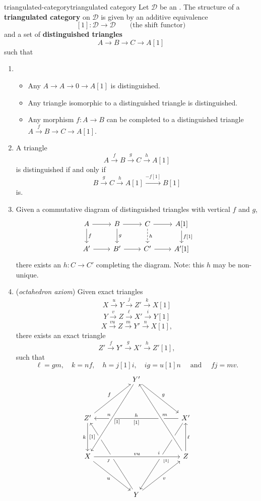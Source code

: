 \begin{topic}{triangulated-category}{triangulated category}
    Let $\mathcal{D}$ be an . The structure of a \textbf{triangulated category} on $\mathcal{D}$ is given by an additive equivalence
    \[ [1] : \mathcal{D} \to \mathcal{D} \qquad \text{(the shift functor)} \]
    and a set of \textbf{distinguished triangles}
    \[ A \to B \to C \to A[1] \]
    such that
    \begin{enumerate}
        \item \begin{itemize}
            \item Any $A \to A \to 0 \to A[1]$ is distinguished.
            \item Any triangle isomorphic to a distinguished triangle is distinguished.
            \item Any morphism $f : A \to B$ can be completed to a distinguished triangle $A \overset{f}{\to} B \to C \to A[1]$.
        \end{itemize}
        \item A triangle
        \[ A \xrightarrow{f} B \xrightarrow{g} C \xrightarrow{h} A[1] \]
        is distinguished if and only if
        \[ B \xrightarrow{g} C \xrightarrow{h} A[1] \xrightarrow{-f[1]} B[1] \]
        is.
        \item Given a commutative diagram of distinguished triangles with vertical $f$ and $g$,
        \[ \begin{tikzcd}
            A \arrow{r} \arrow{d}{f} & B \arrow{r} \arrow{d}{g} & C \arrow{r} \arrow[dashed]{d}{h} & A[1] \arrow{d}{f[1]} \\
            A' \arrow{r} & B' \arrow{r} & C' \arrow{r} & A'[1]
        \end{tikzcd} \]
        there exists an $h : C \to C'$ completing the diagram. Note: this $h$ may be non-unique.
        \item (\textit{octahedron axiom}) Given exact triangles
        \[ X \xrightarrow{u} Y \xrightarrow{j} Z' \xrightarrow{k} X[1] \]
        \[ Y \xrightarrow{v} Z \xrightarrow{\ell} X' \xrightarrow{i} Y[1] \]
        \[ X \xrightarrow{vu} Z \xrightarrow{m} Y' \xrightarrow{n} X[1] , \]
        there exists an exact triangle
        \[ Z' \xrightarrow{f} Y' \xrightarrow{g} X' \xrightarrow{h} Z'[1] , \]
        such that 
        \[ \ell = gm, \quad k = nf, \quad h = j[1]i, \quad ig = u[1]n \quad \text{ and } \quad fj = mv . \]
        \[ \begin{tikzcd}[row sep=4em, column sep=5em] & Y' \arrow{rd}{g} & \\ Z' \arrow{ur}{f} \arrow[d, swap,"k","{[}1{]}"'] \ar[from=ddr, crossing over]{}{j} & & X' \arrow[ddl, swap, "i", "{[}1{]}"'] \arrow[ll, "h"',"{[}1{]}"] \\ X \arrow[swap]{dr}{u} \arrow[crossing over]{rr}{vu} \arrow[swap, from=uur, crossing over, "n", "{[}1{]}"'] & & Z \arrow[swap]{u}{\ell} \arrow[crossing over, swap]{uul}{m} \\ & Y \arrow[swap]{ur}{v} & \end{tikzcd} \]
    \end{enumerate}
\end{topic}

